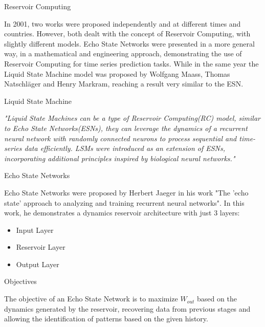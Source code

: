 \begin{frame}{Reservoir Computing}
	\par In 2001, two works were proposed independently and at different times and countries. However, both dealt with the concept of Reservoir Computing, with slightly different models. Echo State Networks were presented in a more general way, in a mathematical and engineering approach, demonstrating the use of Reservoir Computing for time series prediction tasks. While in the same year the Liquid State Machine model was proposed by Wolfgang Maass, Thomas Natschläger and Henry Markram, reaching a result very similar to the ESN.
\end{frame}

\begin{frame}{Liquid State Machine}	
	\par  \textit{"Liquid State Machines can be a type of Reservoir Computing(RC) model, similar to Echo State Networks(ESNs), they can leverage the dynamics of a recurrent neural network with randomly connected neurons to process sequential and time-series data efficiently. LSMs were introduced as an extension of ESNs, incorporating additional principles inspired by biological neural networks."} \cite{3}
\end{frame}

\begin{frame}{Echo State Networks}
	\par Echo State Networks were proposed by Herbert Jaeger in his work "The 'echo state' approach to analyzing and training recurrent neural networks". 
	In this work, he demonstrates a dynamics reservoir architecture with just 3 layers:
	\begin{itemize}
		\item Input Layer
		\item Reservoir Layer
		\item Output Layer
	\end{itemize}
\end{frame}

\begin{frame}{Objectives}
	\par The objective of an Echo State Network is to maximize $W_{out}$ based on the dynamics generated by the reservoir, recovering data from previous stages and allowing the identification of patterns based on the given history.
\end{frame}

